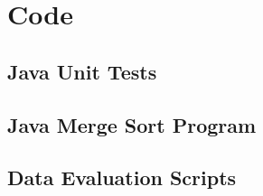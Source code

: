 \documentclass{article}
\begin{document}
  \section{Code}
    \subsection{Java Unit Tests}
      

    \subsection{Java Merge Sort Program}
      

      

    \subsection{Data Evaluation Scripts}  
      
      
\end{document}
